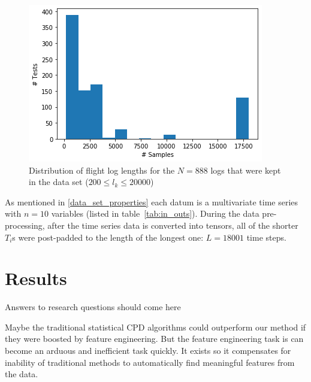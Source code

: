 \begin{figure}[h]
    \centering
    \includegraphics[width=\columnwidth]{Sections/test_lengths.png}
    \caption{Distribution of flight log lengths for the $N=888$ logs that were kept in the data set ($200 \leq l_k \leq 20000$)}
    \label{fig:test_lengths}
\end{figure}

As mentioned in \ref{data_set_properties} each datum is a multivariate time series with $n=10$ variables (listed in table~\ref{tab:in_outs}). 
During the data pre-processing, after the time series data is converted into tensors, all of the shorter $T_i$s were post-padded to the length of the longest one: $L=18001$ time steps. 

\section{Results}
Answers to research questions should come here


Maybe the traditional statistical CPD algorithms could outperform our method if they were boosted by feature engineering. But the feature engineering task is can become an arduous and inefficient task quickly. It exists so it compensates for inability of traditional methods to automatically find meaningful features from the data. \cite{bengio2013deep}



